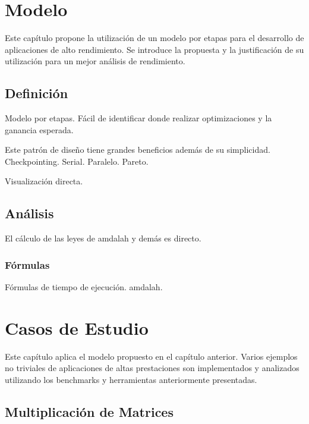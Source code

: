 \documentclass[a4paper]{report}
\begin{document}
\chapter{Modelo}

Este cap\'itulo propone la utilizaci\'on de un modelo por etapas para el desarrollo de aplicaciones de alto rendimiento.
Se introduce la propuesta y la justificaci\'on de su utilizaci\'on para un mejor an\'alisis de rendimiento.

\section{Definici\'on}

Modelo por etapas. F\'acil de identificar donde realizar optimizaciones y la ganancia esperada.


Este patr\'on de dise\~no tiene grandes beneficios adem\'as de su simplicidad. Checkpointing. Serial. Paralelo. Pareto.

Visualizaci\'on directa.

\section{An\'alisis}

 El c\'alculo de las leyes de amdalah y dem\'as es directo.

\subsection{F\'ormulas}


\bigskip

F\'ormulas de tiempo de ejecuci\'on. amdalah.

\chapter{Casos de Estudio}

Este cap\'itulo aplica el modelo propuesto en el cap\'itulo anterior. Varios ejemplos no triviales de aplicaciones de altas prestaciones son implementados
y analizados utilizando los benchmarks y herramientas anteriormente presentadas.

\section{Multiplicaci\'on de Matrices}
\end{document}
